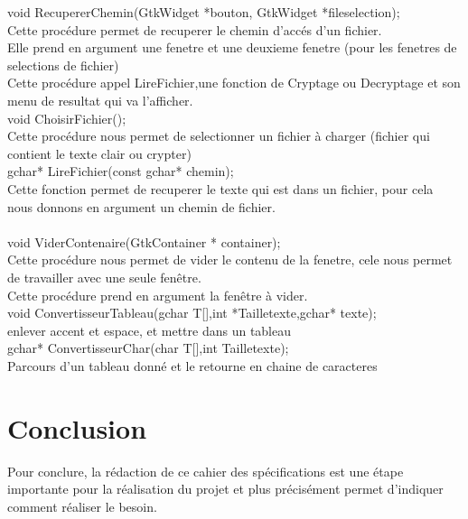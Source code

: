 \documentclass[a4]{article}
\begin{document}
	void RecupererChemin(GtkWidget *bouton, GtkWidget *fileselection);\\
		Cette procédure permet de recuperer le chemin d'accés d'un fichier.\\
		Elle prend en argument une fenetre et une deuxieme fenetre (pour les fenetres de selections de fichier)\\
		Cette procédure appel LireFichier,une fonction de Cryptage ou Decryptage et son menu de resultat qui va l'afficher.\\
		

	void ChoisirFichier();\\
		Cette procédure nous permet de selectionner un fichier à charger (fichier qui contient le texte clair ou 		crypter)\\

		
	gchar* LireFichier(const gchar* chemin);\\
		Cette fonction permet de recuperer le texte qui est dans un fichier, pour cela nous donnons en argument un chemin de fichier.\\
	
	\\
	
	void ViderContenaire(GtkContainer * container);\\
		Cette procédure nous permet de vider le contenu de la fenetre, cele nous permet de travailler avec une seule fenêtre.\\
		Cette procédure prend en argument la fenêtre à vider.\\
	
	void ConvertisseurTableau(gchar T[],int *Tailletexte,gchar* texte);\\
		enlever accent et espace, et mettre dans un tableau\\
	 
	gchar* ConvertisseurChar(char T[],int Tailletexte); \\
		Parcours d'un tableau donné et le retourne en chaine de caracteres\\
		
	
	\section{Conclusion}
	
	Pour conclure, la rédaction de ce cahier des spécifications est une étape importante pour la réalisation du projet
	et plus précisément permet d'indiquer comment réaliser le besoin.\\
	
\end{document}
